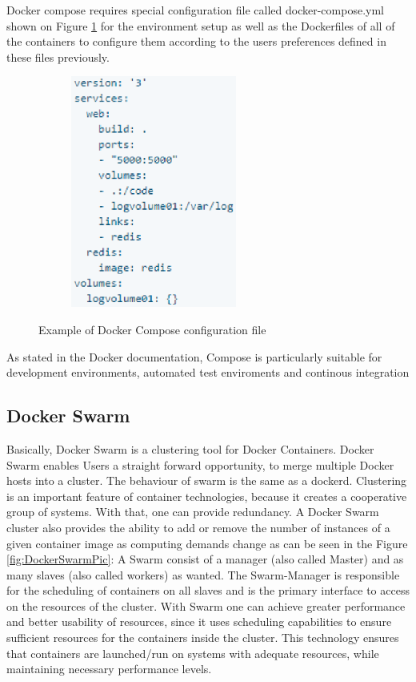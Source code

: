 Docker compose requires special configuration file called
docker-compose.yml shown on Figure \ref{fig:DockerComposeFilePic}
for the environment setup
as well as the Dockerfiles of all of the
containers to configure them according to the users
preferences defined in these files previously\cite{DockerCompose}.

\begin{figure}
\includegraphics[height=3in, width=3in]{dockerComposeExample}
\caption{Example of Docker Compose configuration file}
\cite{DockerComposeFilePic}
\label{fig:DockerComposeFilePic}
\end{figure}

As stated in the Docker documentation, Compose is particularly suitable
for development environments,
automated test enviroments and continous integration

\subsection{Docker Swarm}

Basically, Docker Swarm is a clustering tool for Docker Containers.
Docker Swarm enables Users a straight forward opportunity,
to merge multiple Docker hosts into a cluster\cite{DockerSwarmDefinition}.
The behaviour of swarm is the same as a dockerd.
Clustering is an important feature of container technologies,
because it creates a cooperative group of systems.
With that, one can provide redundancy.
A Docker Swarm cluster also provides the
ability to add or remove the number of instances of a given container
image as computing demands change
as can be seen in the Figure \ref{fig:DockerSwarmPic}:
A Swarm consist of a manager (also called Master) and
as many slaves (also called workers) as wanted.
The Swarm-Manager is responsible for the scheduling
of containers on all slaves and is the primary
interface to access on the resources of the cluster\cite{DockerSwarmKeyConcepts}.
With Swarm one can achieve greater performance and
better usability of resources, since it uses
scheduling capabilities to ensure sufficient resources for
the containers inside the cluster. This technology ensures that containers
are launched/run on systems with adequate resources, while maintaining
necessary performance levels\cite{DockerSwarmHowNodesWork}.

